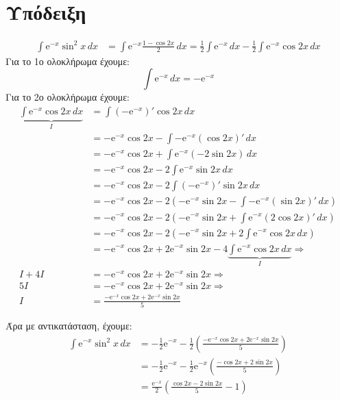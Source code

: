 \documentclass[a4paper,table]{report}
\begin{document}
\section*{Υπόδειξη}

\begin{align*} 
  \int \mathrm{e}^{-x} \sin^{2}{x} \,{dx} &= \int \mathrm{e}^{-x} \frac{1- \cos{2x}
  }{2}  \,{dx} = \frac{1}{2} \int \mathrm{e}^{-x} \,{dx} - \frac{1}{2} \int 
  \mathrm{e}^{-x} \cos{2x} \,{dx} 
\end{align*}
Για το 1ο ολοκλήρωμα έχουμε:
  \[ \int \mathrm{e}^{-x} \,{dx} = - \mathrm{e}^{-x} \]
Για το 2ο ολοκλήρωμα έχουμε:
\begin{align*} 
  \underbrace{\int \mathrm{e}^{-x} \cos{2x} \, dx}_{I} &= \int (- \mathrm{e}^{-x} )' 
  \cos{2x} \,{dx} \\
  &=  - \mathrm{e}^{-x} \cos{2x} - \int - \mathrm{e}^{-x} (\cos{2x} )' \,{dx} \\
  &= - \mathrm{e}^{-x} \cos{2x} + \int \mathrm{e}^{-x} (-2 \sin{2x}) \,{dx}  \\
  &= - \mathrm{e}^{-x} \cos{2x} -2 \int \mathrm{e}^{-x} \sin{2x} \,{dx}  \\
  &= - \mathrm{e}^{-x} \cos{2x} -2 \int (-\mathrm{e}^{-x})' \sin{2x} \,{dx}  \\
  &= - \mathrm{e}^{-x} \cos{2x} -2 \left( - \mathrm{e}^{-x} \sin{2x} - \int - 
  \mathrm{e}^{-x} (\sin{2x} )' \,{dx}\right) \\
  &= - \mathrm{e}^{-x} \cos{2x} -2 \left( - \mathrm{e}^{-x} \sin{2x} + \int  
  \mathrm{e}^{-x} (2\cos{2x} )' \,{dx}\right) \\
  &= - \mathrm{e}^{-x} \cos{2x} -2 \left( - \mathrm{e}^{-x} \sin{2x} + 2 \int  
  \mathrm{e}^{-x} \cos{2x} \,{dx}\right) \\
  &= - \mathrm{e}^{-x} \cos{2x} + 2 \mathrm{e}^{-x} \sin{2x} -4 
  \underbrace{ \int \mathrm{e}^{-x} \cos{2x} \,{dx}}_{I} \Rightarrow \\
  I + 4I &= - \mathrm{e}^{-x} \cos{2x} + 2 \mathrm{e}^{-x} \sin{2x} \Rightarrow \\
  5I &= - \mathrm{e}^{-x} \cos{2x} + 2 \mathrm{e}^{-x} \sin{2x} \Rightarrow \\
  I &= \frac{- \mathrm{e}^{-x} \cos{2x} + 2 \mathrm{e}^{-x} \sin{2x}}{5} 
\end{align*}

Άρα με αντικατάσταση, έχουμε:
\begin{align*}
  \int \mathrm{e}^{-x} \sin^{2}{x} \,{dx} 
  &= -\frac{1}{2} \mathrm{e}^{-x} - \frac{1}{2} 
  \left(\frac{- \mathrm{e}^{-x} \cos{2x} + 2 \mathrm{e}^{-x} \sin{2x}}{5}\right) \\
  &= -\frac{1}{2} \mathrm{e}^{-x} - \frac{1}{2} \mathrm{e}^{-x} 
  \left(\frac{- \cos{2x} + 2 \sin{2x}}{5}\right) \\
  &= \frac{\mathrm{e}^{-x}}{2} \left( \frac{\cos{2x} - 2 \sin{2x}}{5} - 1\right)
\end{align*}
\end{document}
